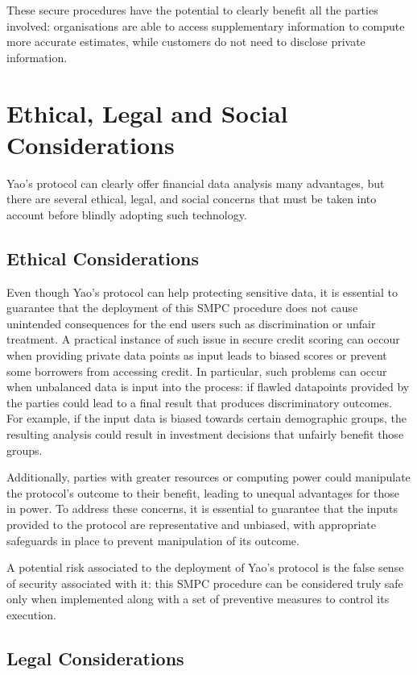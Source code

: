 \documentclass[12pt]{article}
\begin{document}
These secure procedures have the potential to clearly benefit all the parties involved: organisations are able to access supplementary information to compute more accurate estimates, while customers do not need to disclose private information.

\section{Ethical, Legal and Social Considerations}\label{sec:sel}

Yao's protocol can clearly offer financial data analysis many advantages, but there are several ethical, legal, and social concerns that must be taken into account before blindly adopting such technology.

\subsection{Ethical Considerations}

Even though Yao's protocol can help protecting sensitive data, it is essential to guarantee that the deployment of this SMPC procedure does not cause unintended consequences for the end users such as discrimination or unfair treatment. A practical instance of such issue in secure credit scoring can occour when providing private data points as input leads to biased scores or prevent some borrowers from accessing credit. In particular, such problems can occur when unbalanced data is input into the process: if flawled datapoints provided by the parties could lead to a final result that produces discriminatory outcomes. For example, if the input data is biased towards certain demographic groups, the resulting analysis could result in investment decisions that unfairly benefit those groups.

Additionally, parties with greater resources or computing power could manipulate the protocol's outcome to their benefit, leading to unequal advantages for those in power. To address these concerns, it is essential to guarantee that the inputs provided to the protocol are representative and unbiased, with appropriate safeguards in place to prevent manipulation of its outcome.

A potential risk associated to the deployment of Yao's protocol is the false sense of security associated with it: this SMPC procedure can be considered truly safe only when implemented along with a set of preventive measures to control its execution.

\subsection{Legal Considerations}
\end{document}
